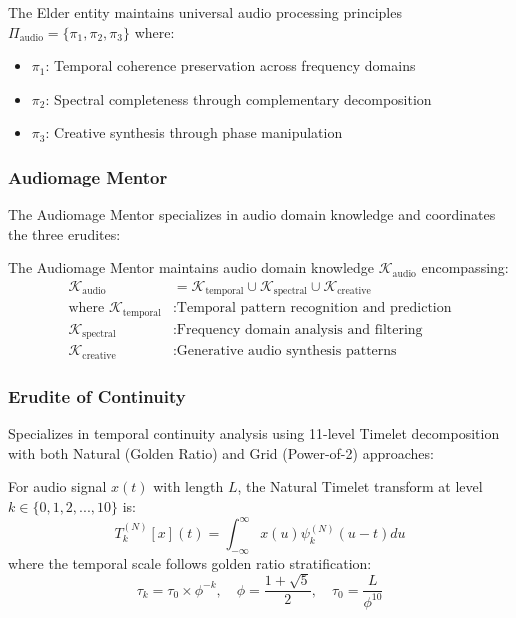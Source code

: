 \begin{definition}
The Elder entity maintains universal audio processing principles $\Pi_{\text{audio}} = \{\pi_1, \pi_2, \pi_3\}$ where:
\begin{itemize}
    \item $\pi_1$: Temporal coherence preservation across frequency domains
    \item $\pi_2$: Spectral completeness through complementary decomposition
    \item $\pi_3$: Creative synthesis through phase manipulation
\end{itemize}
\end{definition}

\subsubsection{Audiomage Mentor}
The Audiomage Mentor specializes in audio domain knowledge and coordinates the three erudites:

\begin{definition}
The Audiomage Mentor maintains audio domain knowledge $\mathcal{K}_{\text{audio}}$ encompassing:
\begin{align}
\mathcal{K}_{\text{audio}} &= \mathcal{K}_{\text{temporal}} \cup \mathcal{K}_{\text{spectral}} \cup \mathcal{K}_{\text{creative}} \\
\text{where } \mathcal{K}_{\text{temporal}} &: \text{Temporal pattern recognition and prediction} \\
\mathcal{K}_{\text{spectral}} &: \text{Frequency domain analysis and filtering} \\
\mathcal{K}_{\text{creative}} &: \text{Generative audio synthesis patterns}
\end{align}
\end{definition}

\subsubsection{Erudite of Continuity}
Specializes in temporal continuity analysis using 11-level Timelet decomposition with both Natural (Golden Ratio) and Grid (Power-of-2) approaches:

\begin{definition}
For audio signal $x(t)$ with length $L$, the Natural Timelet transform at level $k \in \{0,1,2,...,10\}$ is:
\begin{equation}
T^{(N)}_{k}[x](t) = \int_{-\infty}^{\infty} x(u) \psi^{(N)}_{k}(u-t) du
\end{equation}
where the temporal scale follows golden ratio stratification:
\begin{equation}
\tau_k = \tau_0 \times \phi^{-k}, \quad \phi = \frac{1+\sqrt{5}}{2}, \quad \tau_0 = \frac{L}{\phi^{10}}
\end{equation}
\end{definition}

